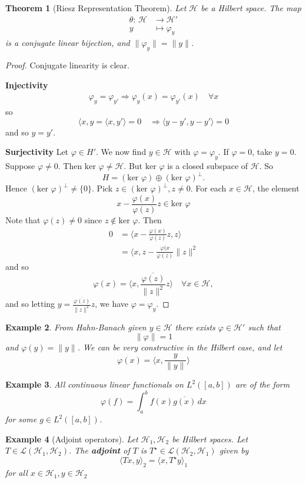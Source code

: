 \documentclass[12pt, oneside, a4paper]{article}
\newtheorem{thm}{Theorem}[section]
\theoremstyle{dfn}
\newtheorem{ex}[thm]{Example}
\def \ker {\text{ker }}
\newcommand{\mapping}[5]{\begin{align*}
    #1 : \,     #2 &\rightarrow #3 \\
            #4  &\mapsto #5
\end{align*}    
}
\renewcommand{\phi}{\varphi}
\newcommand{\Hil}{\mathcal{H}}
\begin{document}
\begin{thm}[Riesz Representation Theorem]
    Let $\Hil$ be a Hilbert space. The map \mapping{\theta}{\Hil}{\Hil'}{y}{\phi_y} is a conjugate linear bijection, and $\| \phi_y \| = \| y \|$.  
\end{thm}
\begin{proof}
    Conjugate linearity is clear.
    
    \textbf{Injectivity} 
    \begin{align*}
        \phi_y = \phi_{y'} \Rightarrow \phi_y(x) = \phi_{y'}(x) \quad \forall x
    \end{align*} so \[
        \langle x, y = \langle x, y' \rangle  = 0 \quad \Rightarrow \langle y - y', y - y' \rangle = 0
    \] and so $y = y'$.
    
    \textbf{Surjectivity}
    Let $\phi \in H'$.  We now find $y \in \Hil$ with $\phi = \phi_y$.  If $\phi = 0$, take $y = 0$.  Suppose $\phi \neq 0$.  Then $\ker \phi \neq \Hil$.  But $\ker \phi$ is a closed subspace of $\Hil$.  So \[
        H = (\ker \phi) \oplus (\ker \phi)^\perp.
    \] Hence $(\ker \phi)^\perp \neq \{ 0 \}$. Pick $z \in (\ker \phi)^\perp, z \neq 0$.  For each $x \in \Hil$, the element \[
        x - \frac{\phi(x)}{\phi(z)} z \in \ker \phi
    \] Note that $\phi(z) \neq 0$ since $z \notin \ker \phi$.  Then \begin{align*}
        0   &=  \langle x - \frac{\phi(x)}{\phi(z)}z, z \rangle \\
            &= \langle x, z - \frac{\phi(x}{\phi(z)} \| z \|^2
    \end{align*}
    and so \[
    \phi(x) = \langle x, \frac{\overline{\phi(z)}}{\| z \|^2} z \rangle \quad \forall x \in \Hil,\]
    and so letting $y = \frac{\overline{\phi(z)}}{\| z \|^2} z$, we have $\phi = \phi_y$.  
\end{proof}

\begin{ex}
    From Hahn-Banach given $y \in \Hil$ there exists $\phi \in \Hil'$ such that \[
        \| \phi \| = 1
    \] and $\phi(y) = \| y \|$. We can be very constructive in the Hilbert case, and let \[
        \phi(x) = \langle x, \frac{y}{\| y \|} \rangle
    \] 
\end{ex}
\begin{ex}
    All continuous linear functionals on $L^2([a,b])$ are of the form \[
        \phi(f) = \int_a^b f(x) \overline{g(x)} \, dx 
    \] for some $g \in L^2([a,b])$.
\end{ex}

\begin{ex}[Adjoint operators]
    Let $\Hil_1, \Hil_2$ be Hilbert spaces.  Let $ T \in \mathcal{L}(\Hil_1, \Hil_2)$.  The \textbf{adjoint} of $T$ is $T^\star \in \mathcal{L}(\Hil_2, \Hil_1)$ given by \[
        \langle T x, y \rangle_2 = \langle x, T^\star y \rangle_1
    \] for all $x \in \Hil_1, y \in \Hil_2$
\end{ex}
\end{document}
